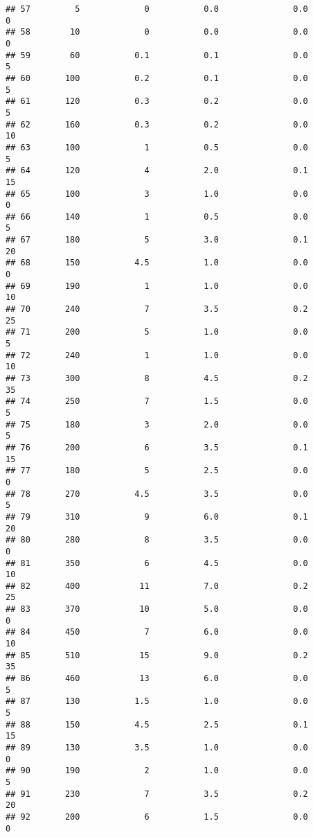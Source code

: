 \documentclass[
]{article}
\begin{document}
\begin{verbatim}
## 57         5             0           0.0               0.0           0
## 58        10             0           0.0               0.0           0
## 59        60           0.1           0.1               0.0           5
## 60       100           0.2           0.1               0.0           5
## 61       120           0.3           0.2               0.0           5
## 62       160           0.3           0.2               0.0          10
## 63       100             1           0.5               0.0           5
## 64       120             4           2.0               0.1          15
## 65       100             3           1.0               0.0           0
## 66       140             1           0.5               0.0           5
## 67       180             5           3.0               0.1          20
## 68       150           4.5           1.0               0.0           0
## 69       190             1           1.0               0.0          10
## 70       240             7           3.5               0.2          25
## 71       200             5           1.0               0.0           5
## 72       240             1           1.0               0.0          10
## 73       300             8           4.5               0.2          35
## 74       250             7           1.5               0.0           5
## 75       180             3           2.0               0.0           5
## 76       200             6           3.5               0.1          15
## 77       180             5           2.5               0.0           0
## 78       270           4.5           3.5               0.0           5
## 79       310             9           6.0               0.1          20
## 80       280             8           3.5               0.0           0
## 81       350             6           4.5               0.0          10
## 82       400            11           7.0               0.2          25
## 83       370            10           5.0               0.0           0
## 84       450             7           6.0               0.0          10
## 85       510            15           9.0               0.2          35
## 86       460            13           6.0               0.0           5
## 87       130           1.5           1.0               0.0           5
## 88       150           4.5           2.5               0.1          15
## 89       130           3.5           1.0               0.0           0
## 90       190             2           1.0               0.0           5
## 91       230             7           3.5               0.2          20
## 92       200             6           1.5               0.0           0

\end{verbatim}
\end{document}
